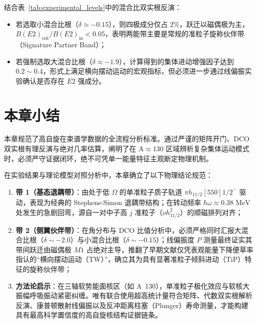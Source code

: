 结合表~\ref{tab:experimental_levels}中的混合比双实根反演：
\begin{itemize}
    \item 若选取小混合比根（$\delta \approx -0.15$），则四极成分仅占 $2\%$，跃迁以磁偶极为主，$B(E2)_{\text{out}}/B(E2)_{\text{in}} < 0.05$，表明两能带主要是常规的准粒子旋称伙伴带（Signature Partner Band）；
    \item 若强制选取大混合比根（$\delta \approx -1.9$），计算得到的集体进动增强因子达到 $0.2 \sim 0.4$，形式上满足横向摆动运动的宏观指标，但必须进一步通过线偏振实验确认是否存在 $E2$ 强成分。
\end{itemize}

\section{本章小结}
\label{sec:case_summary}

本章规范了高自旋在束谱学数据的全流程分析标准。通过严谨的矩阵开门、DCO 双实根有理反演与绝对几率估算，阐明了在 A$\approx$130 区域辨析复杂集体运动模式时，必须严守证据闭环，绝不可凭单一能量特征主观断定物理机制。

在实验结果与理论模型对照分析中，本章确立了以下物理结论规范：
\begin{enumerate}
    \item \textbf{带 1（基态退耦带）}：由处于低 $\Omega$ 的单准粒子质子轨道 $\pi h_{11/2}[550]1/2^-$ 驱动，表现为经典的 Stephens-Simon 退耦带结构；在转动频率 $\hbar\omega \approx 0.38\text{ MeV}$ 处发生的急剧回弯，源自一对中子高 $j$ 准粒子（$\nu h_{11/2}^2$）的顺磁排列对齐；
    \item \textbf{带 2（侧翼伙伴带）}：在角分布与 DCO 比值分析中，必须严格同时汇报大混合比根（$\delta \sim -2.0$）与小混合比根（$\delta \sim -0.15$）；线偏振度 $P$ 测量最终证实其带间跃迁由磁偶极 $M1$ 占绝对主导，推翻了早期文献仅凭表观能量下降便草率指认的“横向摆动运动（TW）”，确立其为具有显著准粒子倾斜进动（TiP）特征的旋称伙伴带；
    \item \textbf{方法论启示}：在三轴软势能面核区（如 A~130），单准粒子极化效应与软核大振幅呼吸振动紧密纠缠。唯有联合使用超高统计量符合矩阵、代数双实根解析反演、康普顿散射线偏振以及反冲距离柱塞（Plunger）寿命测量，才能构建具有最高科学置信度的高自旋核结构证据链条。
\end{enumerate}
